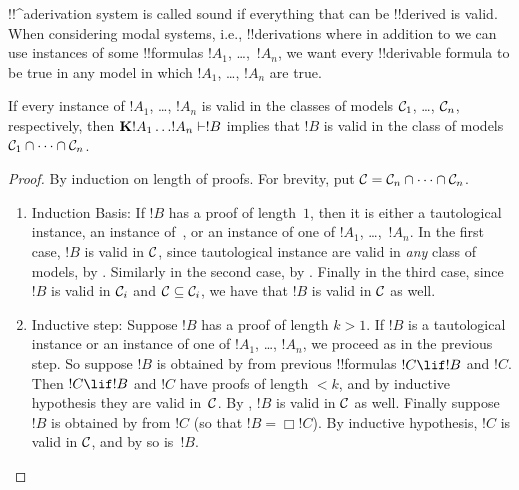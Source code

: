 \documentclass[../../../include/open-logic-section]{subfiles}
\begin{document}


!!^a{derivation} system is called sound if everything that can be
!!{derive}d is valid. When considering modal systems, i.e.,
!!{derivation}s where in addition to  we can use instances of
some !!{formula}s $!A_1$, \dots,~$!A_n$, we want every !!{derivable}
formula to be true in any model in which $!A_1$, \dots, $!A_n$ are
true.  

\begin{thm}
  If every instance of $!A_1$, \dots, $!A_n$ is valid in the
  classes of models $\mathcal{C}_1$, \dots, $\mathcal{C}_n$,
  respectively, then $\Log{K}!A_1\dots !A_n
  \Proves !B$ implies that $!B$ is valid in the class of
  models $\mathcal{C}_1 \cap \dots \cap \mathcal{C}_n$.
\end{thm}

\begin{proof}
  By induction on length of proofs. For brevity, put $\mathcal{C} =
  \mathcal{C}_n \cap \dots \cap \mathcal{C}_n$.
  \begin{enumerate}
  \item Induction Basis: If $!B$ has a proof of length~$1$, then it is
    either a tautological instance, an instance
    of~, or an instance of
    one of $!A_1$, \dots,~$!A_n$. In the first case, $!B$ is valid in
    $\mathcal{C}$, since tautological instance are valid in \emph{any}
    class of models, by . Similarly
    in the second case, by
    . Finally in the third case,
    since $!B$ is valid in $\mathcal{C}_i$ and $\mathcal{C} \subseteq
    \mathcal{C}_i$, we have that $!B$ is valid in $\mathcal{C}$ as well.
  \item Inductive step: Suppose $!B$ has a proof of length $k>1$. If
    $!B$ is a tautological instance or an instance of one of $!A_1$,
    \dots, $!A_n$, we proceed as in the previous step. So suppose $!B$ is
    obtained by \MP{} from previous !!{formula}s $!C \lif !B$ and
    $!C$. Then $!C \lif !B$ and $!C$ have proofs of length $<k$, and
    by inductive hypothesis they are valid in~$\mathcal{C}$. By
    , $!B$ is valid in $\mathcal{C}$ as
    well. Finally suppose $!B$ is obtained by \Nec{} from $!C$ (so
    that $!B = \Box!C$). By inductive hypothesis, $!C$ is valid in
    $\mathcal{C}$, and by  so is~$!B$.
  \end{enumerate}
\end{proof}
\end{document}
